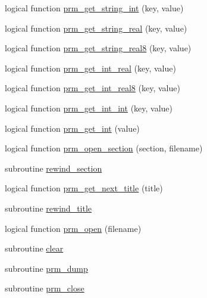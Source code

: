 \begin{DoxyCompactItemize}
\item 
logical function \hyperlink{classprmfile_a99dca731331b0490365d5bd62ca23522}{prm\-\_\-get\-\_\-string\-\_\-int} (key, value)
\item 
logical function \hyperlink{classprmfile_a7d278e2532151a89967338fcbe5330dd}{prm\-\_\-get\-\_\-string\-\_\-real} (key, value)
\item 
logical function \hyperlink{classprmfile_a960cf6439321290e9aaf1ce4c6c22454}{prm\-\_\-get\-\_\-string\-\_\-real8} (key, value)
\item 
logical function \hyperlink{classprmfile_a51390ed9bf1bdb23d74fa390603b5b55}{prm\-\_\-get\-\_\-int\-\_\-real} (key, value)
\item 
logical function \hyperlink{classprmfile_a3ee0c99d2ebb762e4a39e1f32f9c981a}{prm\-\_\-get\-\_\-int\-\_\-real8} (key, value)
\item 
logical function \hyperlink{classprmfile_af1ddae608e4ee57a36e58b56a98865a7}{prm\-\_\-get\-\_\-int\-\_\-int} (key, value)
\item 
logical function \hyperlink{classprmfile_ab89261115f9eb498340c47dfe846e053}{prm\-\_\-get\-\_\-int} (value)
\item 
logical function \hyperlink{classprmfile_a1507dcebf8d6f53a6493b1e63d9c9387}{prm\-\_\-open\-\_\-section} (section, filename)
\item 
subroutine \hyperlink{classprmfile_a68b37b73bf2bf18973a18c91bee024a2}{rewind\-\_\-section}
\item 
logical function \hyperlink{classprmfile_a3fcf260c284cd4ec7be00bb24b37b8a2}{prm\-\_\-get\-\_\-next\-\_\-title} (title)
\item 
subroutine \hyperlink{classprmfile_a157cbf5c68e76d1e77abc81f8dee85cb}{rewind\-\_\-title}
\item 
logical function \hyperlink{classprmfile_a6b78c5340e15c981cec460e03a76b440}{prm\-\_\-open} (filename)
\item 
subroutine \hyperlink{classprmfile_a4ddcca5f77bf3e4414cfdf2b227f59a3}{clear}
\item 
subroutine \hyperlink{classprmfile_ad016bc64aee7ccc5b49bade79c3ad449}{prm\-\_\-dump}
\item 
subroutine \hyperlink{classprmfile_a7fa3b9441106f011cc0b3fa6953b8cb2}{prm\-\_\-close}
\end{DoxyCompactItemize}
